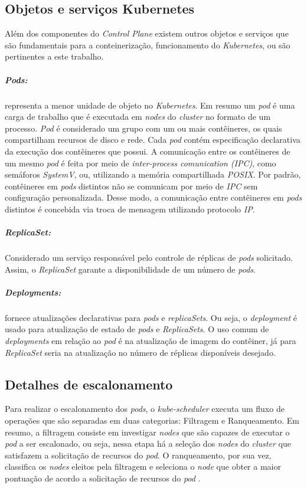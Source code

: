 \newpage
\subsection{Objetos e serviços Kubernetes}
Além dos componentes do \textit{Control Plane} existem outros objetos e serviços que são fundamentais para a conteinerização, funcionamento do \textit{Kubernetes}, ou são pertinentes a este trabalho. 

\subparagraph{\textit{Pods}:} representa a menor unidade de objeto no \textit{Kubernetes}. Em resumo um \textit{pod} é uma carga de trabalho que é executada em \textit{nodes} do \textit{cluster} no formato de um processo.
\textit{Pod} é considerado um grupo com um ou mais contêineres, os quais compartilham recursos de disco e rede. 
Cada \textit{pod} contém especificação declarativa da execução dos contêineres que possui. A comunicação entre os contêineres de um mesmo \textit{pod} é feita por meio de \textit{inter-process comunication (IPC)}, como semáforos \textit{SystemV}, ou, utilizando a memória compartilhada \textit{POSIX}. Por padrão, contêineres em \textit{pods} distintos não se comunicam por meio de \textit{IPC} sem configuração personalizada. Desse modo, a comunicação entre contêineres em \textit{pods} distintos é concebida via troca de mensagem utilizando protocolo \textit{IP}.
	
\subparagraph{\textit{ReplicaSet}:}
Considerado um serviço responsável pelo controle de réplicas de \textit{pods} solicitado. Assim, o \textit{ReplicaSet} garante a disponibilidade de um número de \textit{pods}.
	
\subparagraph{\textit{Deployments}:}
fornece atualizações declarativas para \textit{pods} e \textit{replicaSets}. Ou seja, o \textit{deployment} é usado para atualização de estado de \textit{pods} e \textit{ReplicaSets}. O uso comum de \textit{deployments} em relação ao \textit{pod} é na atualização de imagem do contêiner, já para \textit{ReplicaSet} seria na atualização no número de réplicas disponíveis desejado.

\subsection{Detalhes de escalonamento}
Para realizar o escalonamento dos \textit{pods}, o \textit{kube-scheduler} executa um fluxo de operações que são separadas em duas categorias: Filtragem e Ranqueamento. Em resumo, a filtragem consiste em investigar \textit{nodes} que são capazes de executar o \textit{pod} a ser escalonado, ou seja, nessa etapa há a seleção dos \textit{nodes} do \textit{cluster} que satisfazem a solicitação de recursos do \textit{pod}. O ranqueamento, por sua vez, classifica os \textit{nodes} eleitos pela filtragem e seleciona o \textit{node} que obter a maior pontuação de acordo a solicitação de recursos do \textit{pod} \cite{Kubescheduler}.

